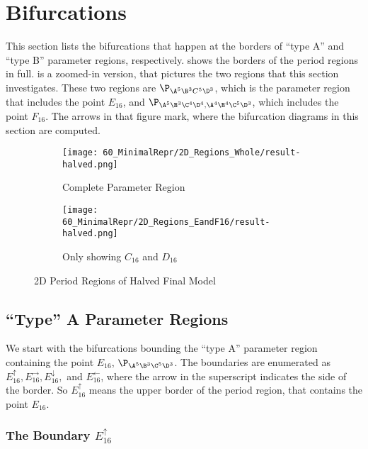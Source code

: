 \section{Bifurcations}

This section lists the bifurcations that happen at the borders of ``type A'' and ``type B'' parameter regions, respectively.
 shows the borders of the period regions in full.
 is a zoomed-in version, that pictures the two regions that this section investigates.
These two regions are $\P_{\A^5\B^3C^5\D^3}$, which is the parameter region that includes the point $E_{16}$, and $\P_{\A^5\B^3\C^4\D^4, \A^4\B^4\C^5\D^3}$, which includes the point $F_{16}$.
The arrows in that figure mark, where the bifurcation diagrams in this section are computed.

\begin{figure}
    \centering
    \begin{subfigure}{0.4\textwidth}
        \centering
        \texttt{[image: 60\_MinimalRepr/2D\_Regions\_Whole/result-halved.png]}
        \caption{Complete Parameter Region}
        \label{fig:final.regions.whole.halved}
    \end{subfigure}
    \begin{subfigure}{0.4\textwidth}
        \centering
        \texttt{[image: 60\_MinimalRepr/2D\_Regions\_EandF16/result-halved.png]}
        \caption{Only showing $C_{16}$ and $D_{16}$}
        \label{fig:final.regions.EandF16.halved}
    \end{subfigure}
    \caption{2D Period Regions of Halved Final Model}
\end{figure}

\subsection{``Type'' A Parameter Regions}

We start with the bifurcations bounding the ``type A'' parameter region containing the point $E_{16}$, $\P_{\A^5\B^3\C^5\D^3}$.
The boundaries are enumerated as $E_{16}^\uparrow, E_{16}^\rightarrow, E_{16}^\downarrow,$ and $E_{16}^\leftarrow$, where the arrow in the superscript indicates the side of the border.
So $E_{16}^\uparrow$ means the upper border of the period region, that contains the point $E_{16}$.

\subsubsection{The Boundary $E_{16}^\uparrow$}
\label{sec:final.bifurcation.typeA.up}

